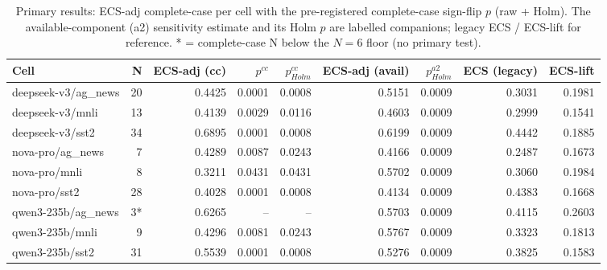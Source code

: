 \begin{table}[t]
\centering
\caption{Primary results: ECS-adj complete-case per cell with the pre-registered complete-case sign-flip $p$ (raw + Holm). The available-component (a2) sensitivity estimate and its Holm $p$ are labelled companions; legacy ECS / ECS-lift for reference. * = complete-case N below the $N{=}6$ floor (no primary test).}
\label{tab:primary}
\begin{tabular}{lrrrrrrrr}
\toprule
Cell & N & ECS-adj (cc) & $p^{cc}$ & $p^{cc}_{Holm}$ & ECS-adj (avail) & $p^{a2}_{Holm}$ & ECS (legacy) & ECS-lift \\
\midrule
deepseek-v3/ag_news & 20 & 0.4425 & 0.0001 & 0.0008 & 0.5151 & 0.0009 & 0.3031 & 0.1981 \\
deepseek-v3/mnli & 13 & 0.4139 & 0.0029 & 0.0116 & 0.4603 & 0.0009 & 0.2999 & 0.1541 \\
deepseek-v3/sst2 & 34 & 0.6895 & 0.0001 & 0.0008 & 0.6199 & 0.0009 & 0.4442 & 0.1885 \\
nova-pro/ag_news & 7 & 0.4289 & 0.0087 & 0.0243 & 0.4166 & 0.0009 & 0.2487 & 0.1673 \\
nova-pro/mnli & 8 & 0.3211 & 0.0431 & 0.0431 & 0.5702 & 0.0009 & 0.3060 & 0.1984 \\
nova-pro/sst2 & 28 & 0.4028 & 0.0001 & 0.0008 & 0.4134 & 0.0009 & 0.4383 & 0.1668 \\
qwen3-235b/ag_news & 3* & 0.6265 & -- & -- & 0.5703 & 0.0009 & 0.4115 & 0.2603 \\
qwen3-235b/mnli & 9 & 0.4296 & 0.0081 & 0.0243 & 0.5767 & 0.0009 & 0.3323 & 0.1813 \\
qwen3-235b/sst2 & 31 & 0.5539 & 0.0001 & 0.0008 & 0.5276 & 0.0009 & 0.3825 & 0.1583 \\
\bottomrule
\end{tabular}
\end{table}
